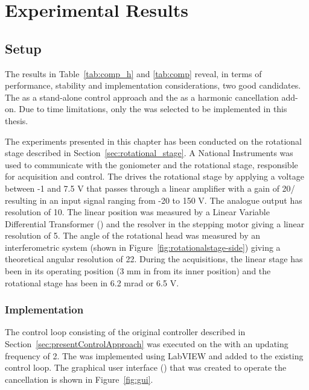 \chapter{Experimental Results}\label{cha:exp_result}
\section{Setup}\label{sec:setup}
The results in Table~\ref{tab:comp_h} and \ref{tab:comp} reveal, in terms of performance, stability and implementation considerations, two good candidates. The \abbrIRC as a stand-alone control approach and the \abbrRFDC as a harmonic cancellation add-on. Due to time limitations, only the \abbrRFDC was selected to be implemented in this thesis.

The experiments presented in this chapter has been conducted on the rotational stage described in Section~\ref{sec:rotational_stage}. A National Instruments \abbrPXI was used to communicate with the goniometer and the rotational stage, responsible for acquisition and control. The \abbrPXI drives the rotational stage by applying a voltage between -1 and 7.5 V that passes through a linear amplifier with a gain of \unit{20}{\volt/\volt} resulting in an input signal ranging from -20 to 150 V. The analogue output has resolution of \unit{10}{\micro\volt}. The linear position was measured by a Linear Variable Differential Transformer (\abbrLVDT) and the resolver in the stepping motor giving a linear resolution of \unit{5}{\micro\meter}. The angle of the rotational head was measured by an interferometric system (shown in Figure~\ref{fig:rotationalstage-side}) giving a theoretical angular resolution of \unit{22}{\pico\radian}. During the acquisitions, the linear stage has been in its operating position (3 mm in from its inner position) and the rotational stage has been in 6.2 mrad or 6.5 V.

\subsection{Implementation}
The control loop consisting of the original controller described in Section~\ref{sec:presentControlApproach} was executed on the \abbrPXI with an updating frequency of \unit{2}{\kilo\hertz}. The \abbrRFDC was implemented using LabVIEW and added to the existing control loop. The graphical user interface (\abbrGUI) that was created to operate the cancellation is shown in Figure~\ref{fig:gui}.

